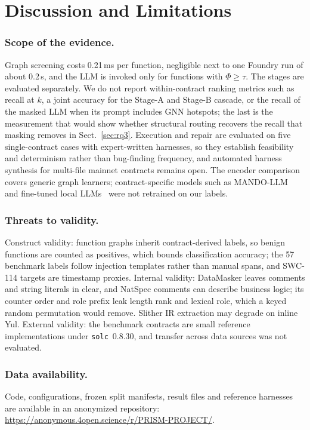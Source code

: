 \documentclass[runningheads]{llncs}
\begin{document}
\section{Discussion and Limitations}
\label{sec:discussion}

\subsubsection{Scope of the evidence.}
Graph screening costs 0.21\,ms per function, negligible next to one Foundry run of about 0.2\,s, and the LLM is invoked only for functions with $\Phi\ge\tau$. The stages are evaluated separately. We do not report within-contract ranking metrics such as recall at $k$, a joint accuracy for the Stage-A and Stage-B cascade, or the recall of the masked LLM when its prompt includes GNN hotspots; the last is the measurement that would show whether structural routing recovers the recall that masking removes in Sect.~\ref{sec:rq3}. Execution and repair are evaluated on five single-contract cases with expert-written harnesses, so they establish feasibility and determinism rather than bug-finding frequency, and automated harness synthesis for multi-file mainnet contracts remains open. The encoder comparison covers generic graph learners; contract-specific models such as MANDO-LLM~\cite{nguyen2026mando} and fine-tuned local LLMs~\cite{yu2025smart} were not retrained on our labels.

\subsubsection{Threats to validity.}
Construct validity: function graphs inherit contract-derived labels, so benign functions are counted as positives, which bounds classification accuracy; the 57 benchmark labels follow injection templates rather than manual spans, and SWC-114 targets are timestamp proxies. Internal validity: DataMasker leaves comments and string literals in clear, and NatSpec comments can describe business logic; its counter order and role prefix leak length rank and lexical role, which a keyed random permutation would remove. Slither IR extraction may degrade on inline Yul. External validity: the benchmark contracts are small reference implementations under \texttt{solc}~0.8.30, and transfer across data sources was not evaluated.

\subsubsection{Data availability.}
Code, configurations, frozen split manifests, result files and reference harnesses are available in an anonymized repository: \url{https://anonymous.4open.science/r/PRISM-PROJECT/}.
\end{document}
